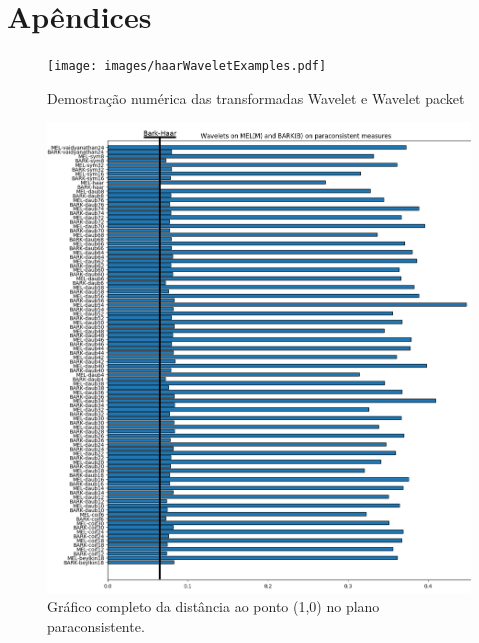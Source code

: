 \chapter{Apêndices}
	\begin{myenv}{1.5}
		
		\begin{landscape}
				\begin{figure}[h]
					\texttt{[image: images/haarWaveletExamples.pdf]}
					\caption{Demostração numérica das transformadas Wavelet e Wavelet packet}
					\label{fig:haarWaveletExamples}
				\end{figure}
		\end{landscape}
		\begin{figure}[h]
			\centering
			\includegraphics[width=0.99\linewidth]{images/results/paraconsistentPlane/ParaconsistentFull}
			\caption{Gráfico completo da distância ao ponto (1,0) no plano paraconsistente.}
			\label{fig:paraconsistentfull}
		\end{figure}
		
	\end{myenv}
	
